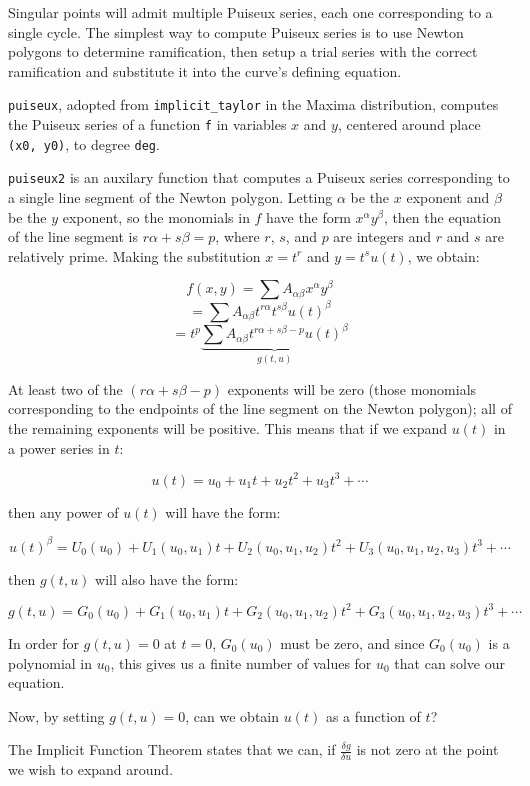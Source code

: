 Singular points will admit multiple Puiseux series, each one
corresponding to a single cycle.  The simplest way to compute Puiseux
series is to use Newton polygons to determine ramification,
then setup a trial series with the correct ramification and
substitute it into the curve's defining equation.

{\tt puiseux}, adopted from {\tt implicit_taylor} in the Maxima
distribution, computes the Puiseux series of a function {\tt f} in
variables $x$ and $y$, centered around place {\tt (x0, y0)},
to degree {\tt deg}.

{\tt puiseux2} is an auxilary function that computes a Puiseux series
corresponding to a single line segment of the Newton polygon.  Letting
$\alpha$ be the $x$ exponent and $\beta$ be the $y$ exponent, so the
monomials in $f$ have the form $x^\alpha y^\beta$, then the equation
of the line segment is $r\alpha + s\beta = p$, where $r$, $s$, and $p$
are integers and $r$ and $s$ are relatively prime.  Making the 
substitution $x=t^r$ and $y=t^s u(t)$, we obtain:

$$f(x,y) = \sum A_{\alpha\beta} x^\alpha y^\beta$$
$$ = \sum A_{\alpha\beta} t^{r \alpha} t^{s \beta} u(t)^\beta$$
$$ = t^p \underbrace{\sum A_{\alpha\beta} t^{r \alpha + s \beta - p} u(t)^\beta}_{g(t,u)}$$

At least two of the $(r \alpha + s \beta - p)$ exponents will be zero
(those monomials corresponding to the endpoints of the line segment on
the Newton polygon); all of the remaining exponents will be positive.
This means that if we expand $u(t)$ in a power series in $t$:

$$u(t) = u_0 + u_1 t + u_2 t^2 + u_3 t^3 + \cdots$$

then any power of $u(t)$ will have the form:

$$u(t)^\beta = U_0(u_0) + U_1(u_0, u_1) t + U_2(u_0, u_1, u_2) t^2 + U_3(u_0,u_1,u_2,u_3) t^3 + \cdots$$

then $g(t,u)$ will also have the form:

$$g(t,u) = G_0(u_0) + G_1(u_0, u_1) t + G_2(u_0, u_1, u_2) t^2 + G_3(u_0,u_1,u_2,u_3) t^3 + \cdots$$

In order for $g(t,u)=0$ at $t=0$, $G_0(u_0)$ must be zero, and since $G_0(u_0)$ is a polynomial
in $u_0$, this gives us a finite number of values for $u_0$ that can solve our equation.

Now, by setting $g(t,u)=0$, can we obtain $u(t)$ as a function of $t$?

The Implicit Function Theorem states that we can, if $\frac{\delta g}{\delta u}$ is not zero
at the point we wish to expand around.

